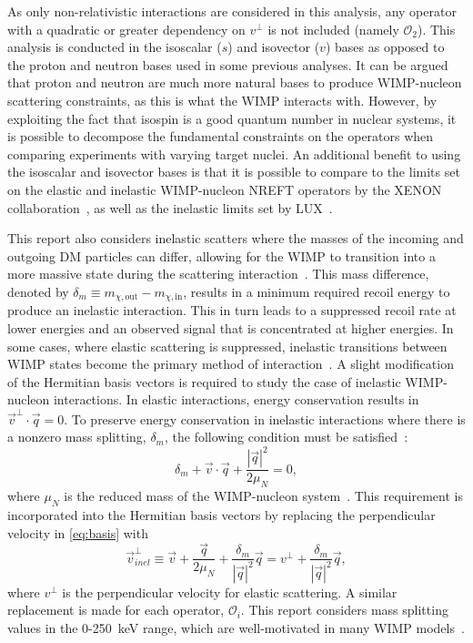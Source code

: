 \documentclass[reprint, showpacs,
preprintnumbers,
amsmath,amssymb,
aps, floatfix,
superscriptaddress,
prd, nofootinbib]{revtex4-1}
\begin{document}
As only non-relativistic interactions are considered in this analysis, any operator with a quadratic or greater dependency on $v^{\perp}$ is not included (namely $\mathcal{O}_2$). 
This analysis is conducted in the isoscalar ($s$) and isovector ($v$) bases as opposed to the proton and neutron bases used in some previous analyses. 
It can be argued that proton and neutron are much more natural bases to produce WIMP-nucleon scattering constraints, as this is what the WIMP interacts with.
However, by exploiting the fact that isospin is a good quantum number in nuclear systems, it is possible to decompose the fundamental constraints on the operators when comparing experiments with varying target nuclei.
An additional benefit to using the isoscalar and isovector bases is that it is possible to compare to the limits set on the elastic and inelastic WIMP-nucleon NREFT operators by the XENON collaboration~\cite{Xenon100:EFT_2017}, as well as the inelastic limits set by LUX~\cite{LUX:EFTR4_2021}.
\par
This report also considers inelastic scatters where the masses of the incoming and outgoing DM particles can differ, allowing for the WIMP to transition into a more massive state during the scattering interaction~\cite{Smith_2001}. 
This mass difference, denoted by $\delta_m \equiv m_{\chi,\mathrm{out}} - m_{\chi,\mathrm{in}}$, results in a minimum required recoil energy to produce an inelastic interaction. This in turn leads to a suppressed recoil rate at lower energies and an observed signal that is concentrated at higher energies. 
In some cases, where elastic scattering is suppressed, inelastic transitions between WIMP states become the primary method of interaction~\cite{Han_1997, Hall_1998}.
A slight modification of the Hermitian basis vectors is required to study the case of inelastic WIMP-nucleon interactions. 
In elastic interactions, energy conservation results in $\vec{v}^{\perp} \cdot \vec{q} = 0$. To preserve energy conservation in inelastic interactions where there is a nonzero mass splitting, $\delta_m$, the following condition must be satisfied~\cite{Barello_2014}:
\begin{equation}\label{eq:massSplitting} 
\delta_m + \vec{v} \cdot \vec{q} +\frac{|\vec{q}|^2}{2\mu_N }= 0, 
\end{equation}
where $\mu_N$ is the reduced mass of the WIMP-nucleon system~\cite{Barello_2014}. 
This requirement is incorporated into the Hermitian basis vectors by replacing the perpendicular velocity in \autoref{eq:basis} with
\begin{equation}\label{eq:idmVelocity} 
\vec{v}^\perp_{inel} \equiv \vec{v} + \frac{\vec{q}}{2\mu_N} + \frac{\delta_m}{|\vec{q}|^2}\vec{q} =v^\perp + \frac{\delta_m}{|\vec{q}|^2}\vec{q}, 
\end{equation}
where $v^\perp$ is the perpendicular velocity for elastic scattering. 
A similar replacement is made for each operator, $\mathcal{O}_i$. 
This report considers mass splitting values in the 0-250~keV range, which are well-motivated in many WIMP models~\cite{Smith_2001, Barello_2014}.
\end{document}
